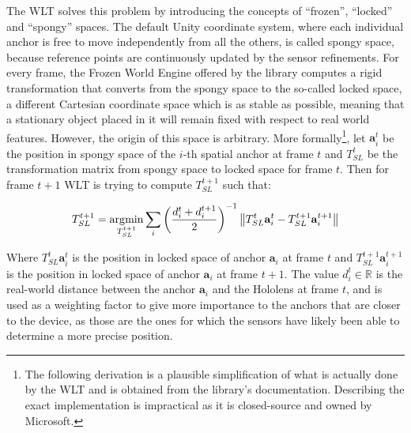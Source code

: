 The \acrlong{WLT} solves this problem by introducing the concepts of \enquote{frozen}, \enquote{locked} and \enquote{spongy} spaces. The default Unity coordinate system, where each individual anchor is free to move independently from all the others, is called spongy space, because reference points are continuously updated by the sensor refinements. For every frame, the Frozen World Engine offered by the library computes a rigid transformation that converts from the spongy space to the so-called locked space, a different Cartesian coordinate space which is as stable as possible, meaning that a stationary object placed in it will remain fixed with respect to real world features. However, the origin of this space is arbitrary. More formally\footnote{The following derivation is a plausible simplification of what is actually done by the \gls{WLT} and is obtained from the library's documentation. Describing the exact implementation is impractical as it is closed-source and owned by Microsoft.}, let $\mathbf{a}_i^t$ be the position in spongy space of the $i$-th spatial anchor at frame $t$ and $T_{SL}^t$ be the transformation matrix from spongy space to locked space for frame $t$. Then for frame $t+1$ \gls{WLT} is trying to compute $T_{SL}^{t+1}$ such that:

\begin{equation}
T_{SL}^{t+1} = \operatorname*{\arg\!\min}_{T_{SL}^{t+1}} \sum_i \left(\frac{d_i^t + d_i^{t+1}}{2}\right)^{-1} \left\lVert T_{SL}^t \mathbf{a}_i^t - T_{SL}^{t+1} \mathbf{a}_i^{t+1} \right\rVert
\end{equation}

Where $T_{SL}^t \mathbf{a}_i^t$ is the position in locked space of anchor $\mathbf{a}_i$ at frame $t$ and $T_{SL}^{t+1} \mathbf{a}_i^{t+1}$ is the position in locked space of anchor $\mathbf{a}_i$ at frame $t+1$. The value $d_i^t \in \mathbb{R}$ is the real-world distance between the anchor $\mathbf{a}_i$ and the Hololens at frame $t$, and is used as a weighting factor to give more importance to the anchors that are closer to the device, as those are the ones for which the sensors have likely been able to determine a more precise position.

